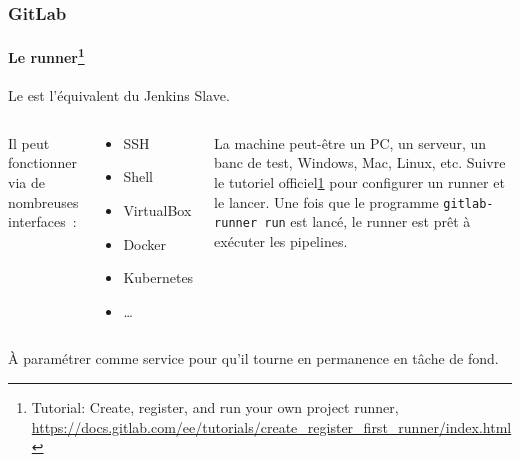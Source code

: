 \documentclass{beamer}
\begin{document}
    \begin{frame}
        \frametitle{GitLab}
        \framesubtitle{Le runner\footnote{\label{configrunner}Tutorial: Create, register, and run your own project runner, \url{https://docs.gitlab.com/ee/tutorials/create\_register\_first\_runner/index.html}}}
        \transdissolve
        Le  est l'équivalent du Jenkins Slave.
        \bigbreak
        \begin{columns}
            Il peut fonctionner via de nombreuses interfaces~:
            \begin{tiny}
                \begin{itemize}
                    \item SSH
                    \item Shell
                    \item VirtualBox
                    \item Docker
                    \item Kubernetes
                    \item \ldots
                \end{itemize}
            \end{tiny}
            La machine peut-être un PC, un serveur, un banc de test, Windows, Mac, Linux, etc.
            \bigbreak
            Suivre le tutoriel officiel\cref{configrunner} pour configurer un runner et le lancer.
            Une fois que le programme \lstinline{gitlab-runner run} est lancé, le runner est prêt à exécuter les pipelines.
        \end{columns}
        \begin{dangercolorbox}
            À paramétrer comme service pour qu'il tourne en permanence en tâche de fond.
        \end{dangercolorbox}
    \end{frame}
\end{document}
